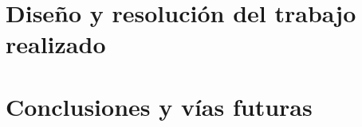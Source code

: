 \chapter{Diseño y resolución del trabajo realizado}
\label{diseno}



 



\chapter{Conclusiones y vías futuras}\label{conslusiones}






